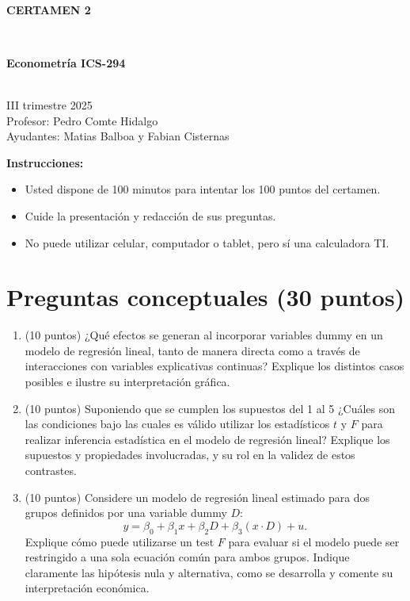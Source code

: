 \documentclass[10pt,a4paper]{article}
\begin{document}
\vspace{5cm}



\begin{center}
\begin{large}
\textbf{\\CERTAMEN 2}
\end{large}\\
\end{center}

\begin{center}
\begin{large}
\textbf{Econometría ICS-294}
\end{large}\\
\vspace{0.2cm}
III trimestre 2025\\
Profesor: Pedro Comte Hidalgo\\
Ayudantes: Matias Balboa y Fabian Cisternas
\end{center}

\textbf{Instrucciones:} 

\begin{itemize}

    \item Usted dispone de 100 minutos  para intentar los 100 puntos del certamen.
    \item Cuide la presentación y redacción de sus preguntas.
    \item No puede utilizar celular, computador o tablet, pero sí una calculadora TI.
     
\end{itemize}

\section{Preguntas conceptuales (30 puntos)}

\begin{enumerate}
    \item  (10 puntos) ¿Qué efectos se generan al incorporar variables dummy en un modelo de regresión lineal, tanto de manera directa como a través de interacciones con variables explicativas continuas? 
Explique los distintos casos posibles e ilustre su interpretación gráfica.

    \item (10 puntos) Suponiendo que se cumplen los supuestos del 1 al 5 ¿Cuáles son las condiciones bajo las cuales es válido utilizar los estadísticos $t$ y $F$ para realizar inferencia estadística en el modelo de regresión lineal?
Explique los supuestos y propiedades involucradas, y su rol en la validez de estos contrastes.

\item (10 puntos) Considere un modelo de regresión lineal estimado para dos grupos definidos por una variable dummy $D$:
\[
y = \beta_0 + \beta_1 x + \beta_2 D + \beta_3 (x \cdot D) + u.
\]
Explique cómo puede utilizarse un test $F$ para evaluar si el modelo puede ser restringido a una sola ecuación común para ambos grupos.
Indique claramente las hipótesis nula y alternativa, como se desarrolla y comente su interpretación económica.

\end{enumerate}
\end{document}
